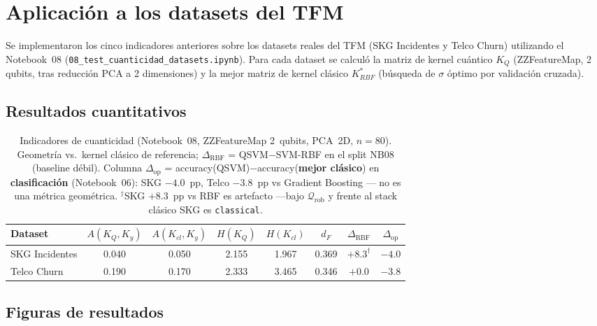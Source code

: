 \section{Aplicación a los datasets del TFM}
\label{sec:aplicacion_cuanticidad}

Se implementaron los cinco indicadores anteriores sobre los datasets reales del TFM (SKG Incidentes y Telco Churn) utilizando el Notebook~08 (\texttt{08\_test\_cuanticidad\_datasets.ipynb}). Para cada dataset se calculó la matriz de kernel cuántico $K_Q$ (ZZFeatureMap, 2 qubits, tras reducción PCA a 2 dimensiones) y la mejor matriz de kernel clásico $K_{RBF}^*$ (búsqueda de $\sigma$ óptimo por validación cruzada).

\subsection{Resultados cuantitativos}

\begin{table}[ht]
\centering
\small
\begin{tabular}{lccccccc}
\hline
\textbf{Dataset} & $A(K_Q,K_y)$ & $A(K_{cl},K_y)$ & $H(K_Q)$ & $H(K_{cl})$ & $d_F$ & $\Delta_{\mathrm{RBF}}$ & \textbf{$\Delta_{\mathrm{op}}$} \\
\hline
SKG Incidentes   & 0.040 & 0.050 & 2.155 & 1.967 & 0.369 & $+8.3^\dagger$ & $\mathbf{-4.0}$ \\
Telco Churn      & 0.190 & 0.170 & 2.333 & 3.465 & 0.346 & $+$0.0 & $\mathbf{-3.8}$ \\
\hline
\end{tabular}
\caption{Indicadores de cuanticidad (Notebook~08, ZZFeatureMap 2~qubits, PCA~2D, $n=80$). Geometría vs.\ kernel clásico de referencia; $\Delta_{\mathrm{RBF}}$ = QSVM$-$SVM-RBF en el split NB08 (baseline débil). Columna $\Delta_{\mathrm{op}}$ = accuracy(QSVM)$-$accuracy(\textbf{mejor clásico}) en \textbf{clasificación} (Notebook~06): SKG $-4.0$~pp, Telco $-3.8$~pp vs Gradient Boosting --- no es una métrica geométrica. $^\dagger$SKG $+8.3$~pp vs RBF es artefacto ---bajo $\mathcal{Q}_{\mathrm{rob}}$ y frente al stack clásico SKG es \texttt{classical}.}
\label{tab:indicadores_resultados}
\end{table}

\subsection{Figuras de resultados}

